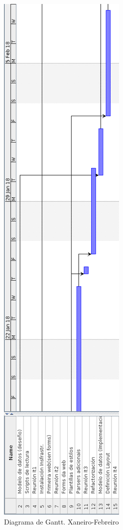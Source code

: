 \begin{figure}[H]
	\centering
	\includegraphics[scale=0.45,keepaspectratio=true]{./images/gantt/g4.png}
	\caption{Diagrama de Gantt. Xaneiro-Febreiro}
\end{figure}

